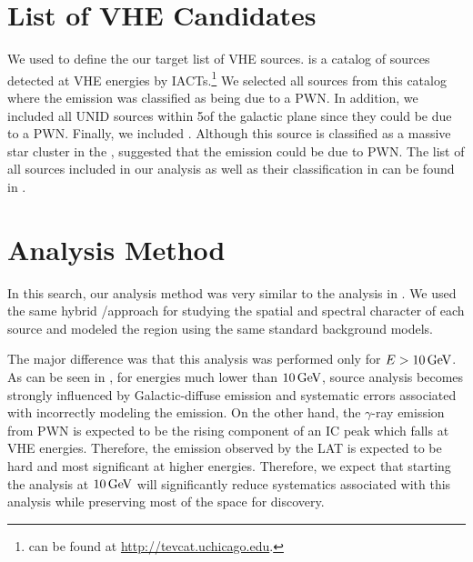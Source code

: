 \section{List of \ac{VHE}  Candidates}



We used \tevcat to define the our target list of \ac{VHE}
sources.  \tevcat is a catalog of sources detected at \ac{VHE}
energies by \acp{IACT}.\footnote{\tevcat can be found at
\url{http://tevcat.uchicago.edu}.}  We selected all sources from this
catalog where the emission was classified as being due to a \ac{PWN}. In
addition, we included all \ac{UNID} sources within 5\degree of the
galactic plane since they could be due to a \ac{PWN}.  Finally, we
included . Although this source is classified as a massive
star cluster in the \tevcat, \cite{de-naurois_2013a_galactic-h.e.s.s.}
suggested that the emission could be due to \ac{PWN}. The list of all
sources included in our analysis as well as their classification in
\tevcat can be found in .

\section{Analysis Method} 

In this search, our analysis method was very similar to the analysis in
. We used the same hybrid \pointlike/\gtlike approach
for studying the spatial and spectral character of each source and
modeled the region using the same standard background models.

The major difference was that this analysis was performed only for
$E>10\,\text{GeV}$.  As can be seen in , for
energies much lower than $10\,\text{GeV}$, source analysis becomes
strongly influenced by Galactic-diffuse emission and systematic errors
associated with incorrectly modeling the emission. On the other hand,
the $\gamma$-ray emission from \ac{PWN} is expected to be the rising
component of an \ac{IC} peak which falls at \ac{VHE} energies. Therefore,
the emission observed by the \ac{LAT} is expected to be hard and most
significant at higher energies. Therefore, we expect that starting the
analysis  at $10\,\text{GeV}$ will significantly reduce systematics
associated with this analysis while preserving most of the space for
discovery.


